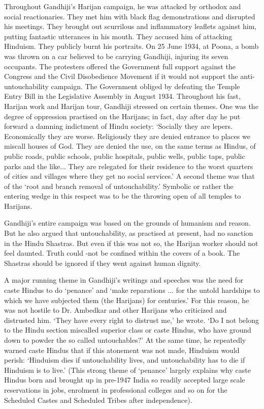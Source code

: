 Throughout Gandhiji's Harijan campaign, he was attacked by orthodox and social reactionaries. They met him with black flag demonstrations and disrupted his meetings. They brought out scurrilous and inflammatory leaflets against him, putting fantastic utterances in his mouth. They accused him of attacking Hinduism. They publicly burnt his portraits. On 25 June 1934, at Poona, a bomb was thrown on a car believed to be carrying Gandhiji, injuring its seven occupants. The protesters offered the Government full support against the Congress and the Civil Disobedience Movement if it would not support the anti-untouchability campaign. The Government obliged by defeating the Temple Entry Bill in the Legislative Assembly in August 1934. Throughout his fast, Harijan work and Harijan tour, Gandhiji stressed on certain themes. One was the degree of oppression practised on the Harijans; in fact, day after day he put forward a damning indictment of Hindu society: `Socially they are lepers. Economically they are worse. Religiously they are denied entrance to places we miscall houses of God. They are denied the use, on the same terms as Hindus, of public roads, public schools, public hospitals, public wells, public taps, public parks and the like... They are relegated for their residence to the worst quarters of cities and villages where they get no social services.' A second theme was that of the `root and branch removal of untouchability.' Symbolic or rather the entering wedge in this respect was to be the throwing open of all temples to Harijans. 

Gandhiji's entire campaign was based on the grounds of humanism and reason. But he also argued that untouchability, as practised at present, had no sanction in the Hindu Shastras. But even if this was not so, the Harijan worker should not feel daunted. Truth could -not be confined within the covers of a book. The Shastras should be ignored if they went against human dignity. 

A major running theme in Gandhiji's writings and speeches was the need for caste Hindus to do `penance' and `make reparations ... for the untold hardships to which we have subjected them (the Harijans) for centuries.' For this reason, he was not hostile to Dr. Ambedkar and other Harijans who criticized and distrusted him. `They have every right to distrust me,' he wrote. `Do I not belong to the Hindu section miscalled superior class or caste Hindus, who have ground down to powder the so called untouchables?' At the same time, he repeatedly warned caste Hindus that if this atonement was not made, Hinduism would perish: `Hinduism dies if untouchability lives, and untouchability has to die if Hinduism is to live.' (This strong theme of `penance' largely explains why caste Hindus born and brought up in pre-1947 India so readily accepted large scale reservations in jobs, enrolment in professional colleges and so on for the Scheduled Castes and Scheduled Tribes after independence). 


